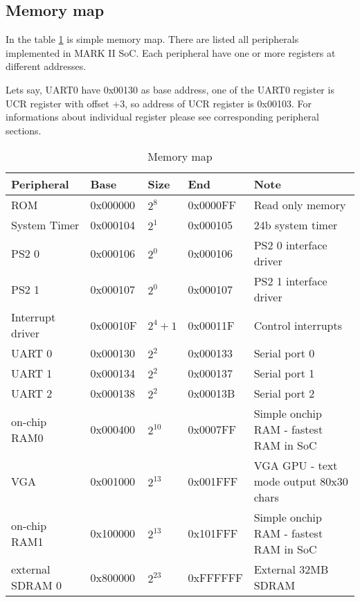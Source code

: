 \subsection{Memory map}

In the table \ref{tab:memory_map} is simple memory map. There are listed all
peripherals implemented in MARK II SoC. Each peripheral have one or more registers at different
addresses.

Lets say, UART0 have 0x00130 as base address, one of the UART0 register
is UCR register with offset +3, so address of UCR register is 0x00103. For
informations about individual register please see corresponding peripheral sections.

\begin{table}[h]
    \centering
    \begin{tabular}{|l|l|l|l|l|}
        \hline
        \textbf{Peripheral} & \textbf{Base} & \textbf{Size} & \textbf{End} & \textbf{Note}                                  \\ \hline
        ROM                 & 0x000000      & $2^{8}$       & 0x0000FF     & Read only memory                               \\ \hline
        System Timer        & 0x000104      & $2^{1}$       & 0x000105     & 24b system timer                               \\ \hline
        PS2 0               & 0x000106      & $2^{0}$       & 0x000106     & PS2 0 interface driver                         \\ \hline
        PS2 1               & 0x000107      & $2^{0}$       & 0x000107     & PS2 1 interface driver                         \\ \hline
        Interrupt driver    & 0x00010F      & $2^{4} + 1$   & 0x00011F     & Control interrupts                             \\ \hline
        UART 0              & 0x000130      & $2^{2}$       & 0x000133     & Serial port 0                                  \\ \hline
        UART 1              & 0x000134      & $2^{2}$       & 0x000137     & Serial port 1                                  \\ \hline
        UART 2              & 0x000138      & $2^{2}$       & 0x00013B     & Serial port 2                                  \\ \hline
        on-chip RAM0        & 0x000400      & $2^{10}$      & 0x0007FF     & Simple onchip RAM - fastest RAM in SoC         \\ \hline
        VGA                 & 0x001000      & $2^{13}$      & 0x001FFF     & VGA GPU - text mode output 80x30 chars         \\ \hline
        on-chip RAM1        & 0x100000      & $2^{13}$      & 0x101FFF     & Simple onchip RAM - fastest RAM in SoC         \\ \hline
        external SDRAM 0    & 0x800000      & $2^{23}$      & 0xFFFFFF     & External 32MB SDRAM                            \\ \hline
    \end{tabular}
    \caption{Memory map}
    \label{tab:memory_map}
\end{table}
